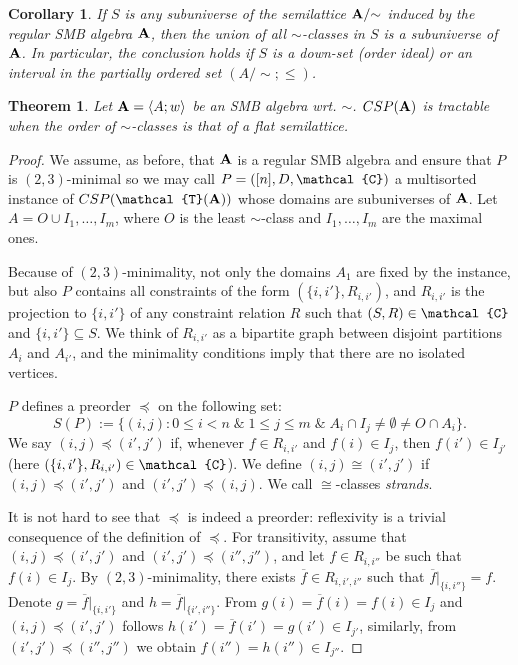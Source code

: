 \documentclass[10pt,a4paper]{amsart}
\newtheorem{cor}{Corollary}
\newtheorem{thm}{Theorem}
\newcommand{\lb}{\langle}
\newcommand{\m}[1]{{\uppercase {\mathbf {#1}}}}
\newcommand{\rb}{\rangle}
\newcommand{\vr}[1]{{\uppercase {\mathcal{#1}}}}
\begin{document}
\begin{cor}\label{regSMBsubalg}
If $S$ is any subuniverse of the semilattice $\m a/{\sim}$ induced by the regular SMB algebra $\m a$, then the union of all $\sim$-classes in $S$ is a subuniverse of $\m a$. In particular, the conclusion holds if $S$ is a down-set (order ideal) or an interval in the partially ordered set $(A/{\sim};\leq)$.
\end{cor}

\begin{thm}\label{flattract}
Let $\m a=\lb A;w\rb$ be an SMB algebra wrt. $\sim$. $CSP(\m a)$ is tractable when the order of $\sim$-classes is that of a flat semilattice.
\end{thm}

\begin{proof}
We assume, as before, that $\m a$ is a regular SMB algebra and ensure that $P$ is $(2,3)$-minimal so we may call $P=([n],D,\vr c)$ a multisorted instance of $CSP(\vr t(\m a))$ whose domains are subuniverses of $\m a$. Let $A=O\cup I_1,\ldots,I_m$, where $O$ is the least $\sim$-class and $I_1,\ldots,I_m$ are the maximal ones. 

Because of $(2,3)$-minimality, not only the domains $A_1$ are fixed by the instance, but also $P$ contains all constraints of the form $(\{i,i'\},R_{i,i'})$, and $R_{i,i'}$ is the projection to $\{i,i'\}$ of any constraint relation $R$ such that $(S,R)\in \vr c$ and $\{i,i'\}\subseteq S$. We think of $R_{i,i'}$ as a bipartite graph between disjoint partitions $A_i$ and $A_{i'}$, and the minimality conditions imply that there are no isolated vertices.

$P$ defines a preorder $\preceq$ on the following set: 
$$S(P):=\{(i,j):0\leq i<n \;\&\; 1\leq j\leq m \;\&\; A_i\cap I_j\neq\emptyset\neq O\cap A_i\}.$$ 
We say $(i,j)\preceq(i',j')$ if, whenever $f\in R_{i,i'}$ and $f(i)\in I_j$, then $f(i')\in I_{j'}$ (here $(\{i,i'\},R_{i,i'})\in\vr c$). We define $(i,j)\cong(i',j')$ if $(i,j)\preceq(i',j')$ and $(i',j')\preceq(i,j)$. We call $\cong$-classes {\em strands}.

It is not hard to see that $\preceq$ is indeed a preorder: reflexivity is a trivial consequence of the definition of $\preceq$. For transitivity, assume that $(i,j)\preceq(i',j')$ and $(i',j')\preceq(i'',j'')$, and let $f\in R_{i,i''}$ be such that $f(i)\in I_j$. By $(2,3)$-minimality, there exists $\overline{f}\in R_{i,i',i''}$ such that $\overline{f}|_{\{i,i''\}}=f$. Denote $g=\overline{f}|_{\{i,i'\}}$ and $h=\overline{f}|_{\{i',i''\}}$. From $g(i)=\overline{f}(i)=f(i)\in I_j$ and $(i,j)\preceq(i',j')$ follows $h(i')=\overline{f}(i')=g(i')\in I_{j'}$, similarly, from $(i',j')\preceq(i'',j'')$ we obtain $f(i'')=h(i'')\in I_{j''}$.


\end{proof}
\end{document}
